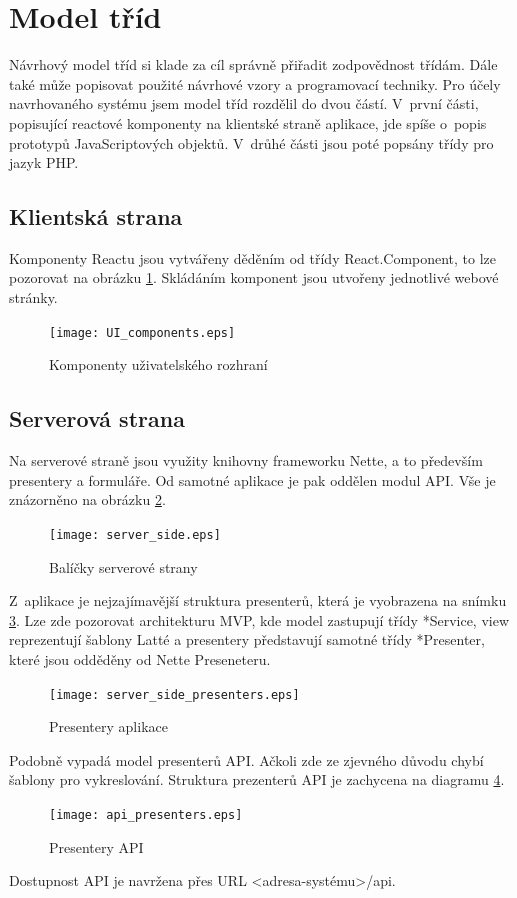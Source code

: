\documentclass[thesis=B,czech]{FITthesis}[2012/06/26]
\begin{document}
\section{Model tříd}
	Návrhový model tříd si klade za cíl správně přiřadit zodpovědnost třídám. Dále také může popisovat použité návrhové vzory a programovací techniky.\cite{si1_pred6} Pro účely navrhovaného systému jsem model tříd rozdělil do dvou částí. V~první části, popisující reactové komponenty na klientské straně aplikace, jde spíše o~popis prototypů JavaScriptových objektů. V~drůhé části jsou poté popsány třídy pro jazyk PHP.
	
\subsection{Klientská strana}
	Komponenty Reactu jsou vytvářeny děděním od třídy React.Component, to lze pozorovat na obrázku \ref{ui_komponents}. Skládáním komponent jsou utvořeny jednotlivé webové stránky.
	
\begin{figure}
	\texttt{[image: UI\_components.eps]}
	\caption{Komponenty uživatelského rozhraní}\label{ui_komponents}
\end{figure}

\subsection{Serverová strana}
	Na serverové straně jsou využity knihovny frameworku Nette, a to především presentery a formuláře. Od samotné aplikace je pak oddělen modul API. Vše je znázorněno na obrázku \ref{server_side}.
	
\begin{figure}
	\texttt{[image: server\_side.eps]}
	\caption{Balíčky serverové strany}\label{server_side}
\end{figure}

	Z~aplikace je nejzajímavější struktura presenterů, která je vyobrazena na snímku \ref{server_side_presenters}. Lze zde pozorovat architekturu MVP, kde model zastupují třídy *Service, view reprezentují šablony Latté a presentery představují samotné třídy *Presenter, které jsou odděděny od Nette Preseneteru.

\begin{figure}
	\texttt{[image: server\_side\_presenters.eps]}
	\caption{Presentery aplikace}\label{server_side_presenters}
\end{figure}	
	
	Podobně vypadá model presenterů API. Ačkoli zde ze zjevného důvodu chybí šablony pro vykreslování. Struktura prezenterů API je zachycena na diagramu \ref{api_presenters}.
\begin{figure}
	\texttt{[image: api\_presenters.eps]}
	\caption{Presentery API}\label{api_presenters}
\end{figure}
	Dostupnost API je navržena přes URL <adresa-systému>/api.
\end{document}
